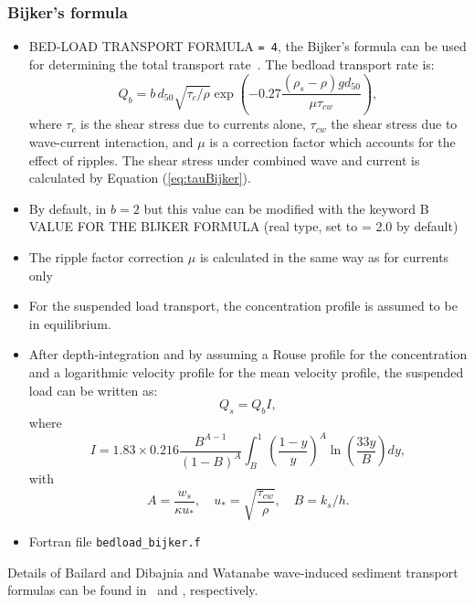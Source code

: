 \subsubsection{Bijker's formula}
\begin{itemize}
\item {\ttfamily BED-LOAD TRANSPORT FORMULA} \texttt{= 4}, the Bijker's formula can be used for determining the total transport rate~\cite{Bijker}. The bedload transport rate is:
\begin{equation*}
Q_b = b\,d_{50}\sqrt{\tau_c/\rho}\exp\left(-0.27\frac{(\rho_s-\rho)gd_{50}}{\mu \tau_{cw}}\right),
\end{equation*}
where $\tau_c$ is the shear stress due to currents alone, $\tau_{cw}$ the shear stress due to wave-current
interaction, and $\mu$ is a correction factor which accounts for the effect of ripples. The shear stress under combined wave and current is calculated
by Equation (\ref{eq:tauBijker}).
\item By default, in \gaia{} $b=2$ but this value can be modified with the keyword {\ttfamily B VALUE FOR THE BIJKER FORMULA} (real type, set to {\ttfamily = 2.0} by default)

\item The ripple factor correction $\mu$ is calculated in the same way as for currents only
  \item For the suspended load transport, the
concentration profile is assumed to be in equilibrium.

\item After depth-integration and by assuming a Rouse profile for the concentration
and a logarithmic velocity profile for the mean velocity profile, the
suspended load can be written as:
\begin{equation*}
Q_{s} = Q_{b} I,
\end{equation*}
where
\begin{equation*}
I=1.83\times 0.216\frac{B^{A-1}}{(1-B)^A} \int_B^1
\left(\frac{1-y}{y}\right)^A \ln\left(\frac{33y}{B}\right) d y,
\end{equation*}
with
\begin{equation*}
A = \frac{w_s}{\kappa u_*},\quad u_*=\sqrt{\frac{\tau_{cw}}{\rho}},\quad B = k_s/h.
\end{equation*}
\item Fortran file \texttt{bedload\_bijker.f}
\end{itemize}

Details of Bailard and Dibajnia and Watanabe wave-induced sediment transport formulas can be found in~\cite{Bailard} and \cite{Dibajnia}, respectively.





